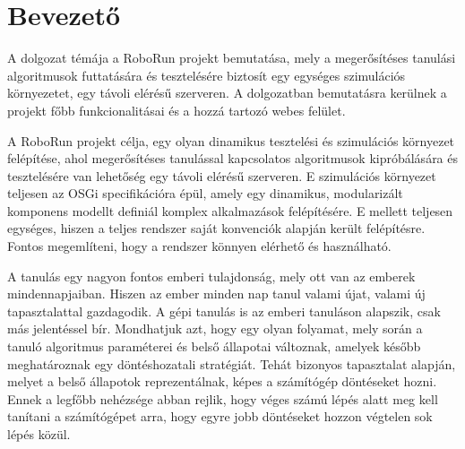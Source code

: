 \chapter{Bevezető}\label{ch:BEVEZETO}
	A dolgozat témája a RoboRun projekt bemutatása, mely a megerősítéses tanulási algoritmusok futtatására és tesztelésére biztosít egy egységes szimulációs környezetet, egy távoli elérésű szerveren. 
A dolgozatban bemutatásra kerülnek a projekt főbb funkcionalitásai és a hozzá tartozó webes felület.

	A RoboRun projekt célja, egy olyan dinamikus tesztelési és szimulációs környezet felépítése, ahol megerősítéses tanulással kapcsolatos algoritmusok kipróbálására és tesztelésére van lehetőség egy távoli elérésű szerveren. E szimulációs környezet teljesen az OSGi\cite{osgi} specifikációra épül, amely egy dinamikus, modularizált komponens modellt definiál komplex alkalmazások felépítésére. E mellett teljesen egységes, hiszen a teljes rendszer saját konvenciók alapján került felépítésre. Fontos megemlíteni, hogy a rendszer könnyen elérhető és használható.
	
	A tanulás egy nagyon fontos emberi tulajdonság, mely ott van az emberek mindennapjaiban. Hiszen az ember minden nap tanul valami újat, valami új tapasztalattal gazdagodik. A gépi tanulás is az emberi tanuláson alapszik, csak más jelentéssel bír. Mondhatjuk azt, hogy egy olyan folyamat, mely során a tanuló algoritmus paraméterei és belső állapotai változnak, amelyek később meghatároznak egy döntéshozatali stratégiát. Tehát bizonyos tapasztalat alapján, melyet a belső állapotok reprezentálnak, képes a számítógép döntéseket hozni. Ennek a legfőbb nehézsége abban rejlik, hogy véges számú lépés alatt meg kell tanítani a számítógépet arra, hogy egyre jobb döntéseket hozzon végtelen sok lépés közül.
	

